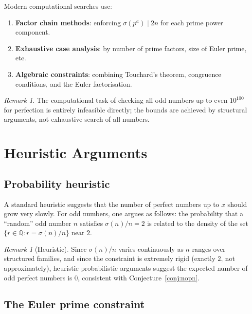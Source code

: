 \documentclass[12pt,a4paper]{amsart}
\theoremstyle{definition}
\theoremstyle{remark}
\newtheorem{remark}[theorem]{Remark}
\newcommand{\Q}{\mathbb{Q}}
\begin{document}
Modern computational searches use:
\begin{enumerate}[label=(\arabic*)]
  \item \textbf{Factor chain methods}: enforcing $\sigma(p^a) \mid 2n$ for each
        prime power component.
  \item \textbf{Exhaustive case analysis}: by number of prime factors, size of
        Euler prime, etc.
  \item \textbf{Algebraic constraints}: combining Touchard's theorem,
        congruence conditions, and the Euler factorisation.
\end{enumerate}

\begin{remark}
The computational task of checking all odd numbers up to even $10^{100}$ for
perfection is entirely infeasible directly; the bounds are achieved by structural
arguments, not exhaustive search of all numbers.
\end{remark}

\section{Heuristic Arguments}

\subsection{Probability heuristic}

A standard heuristic suggests that the number of perfect numbers up to $x$
should grow very slowly.
For odd numbers, one argues as follows:
the probability that a ``random'' odd number $n$ satisfies $\sigma(n)/n = 2$
is related to the density of the set $\{r \in \Q : r = \sigma(n)/n\}$
near $2$.

\begin{remark}[Heuristic]
Since $\sigma(n)/n$ varies continuously as $n$ ranges over structured families,
and since the constraint is extremely rigid (exactly $2$, not approximately),
heuristic probabilistic arguments suggest the expected number of odd perfect
numbers is $0$, consistent with Conjecture~\ref{conj:nopn}.
\end{remark}

\subsection{The Euler prime constraint}
\end{document}
